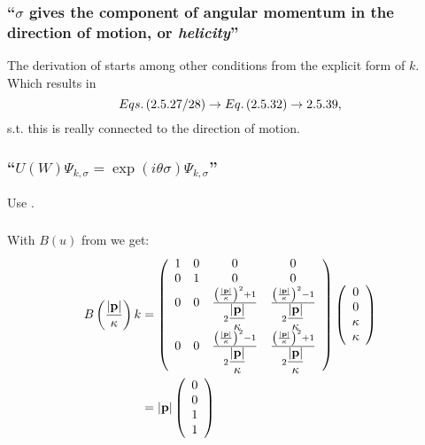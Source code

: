 \subsubsection{\enquote{$\sigma$ gives the component of angular momentum in the direction of motion, or \emph{helicity}} }
The derivation of  starts among other conditions from the explicit form of $k$. Which results in \[Eqs.\,({2.5.27/28})\rightarrow Eq.\,({2.5.32})\rightarrow{2.5.39},\]
s.t. this is really connected to the direction of motion.

\subsubsection{\enquote{$U(W)\Psi_{k,\sigma}=\exp(i\theta\sigma)\Psi_{k,\sigma}$} }
Use .

\subsubsection{ }
With $B(u)$ from  we get:
\begin{align*} 
	B\left(\dfrac{\abs{\mathbf{p}}}{\kappa}\right) k&=
	\left(\begin{array}{cccc}
		1&  0&  0&  0\\
		0&  1&  0&  0\\
		0&  0&  \frac{\left(\frac{\abs{\mathbf{p}}}{\kappa}\right)^2+1}{2\dfrac{\abs{\mathbf{p}}}{\kappa}}&  \frac{\left(\frac{\abs{\mathbf{p}}}{\kappa}\right)^2-1}{2\dfrac{\abs{\mathbf{p}}}{\kappa}}\\
		0&  0&  \frac{\left(\frac{\abs{\mathbf{p}}}{\kappa}\right)^2-1}{2\dfrac{\abs{\mathbf{p}}}{\kappa}}& \frac{\left(\frac{\abs{\mathbf{p}}}{\kappa}\right)^2+1}{2\dfrac{\abs{\mathbf{p}}}{\kappa}}
	\end{array}\right)
	\left(
	\begin{array}{c}
		0\\
		0\\
		\kappa\\
		\kappa
	\end{array}
	\right)\\
	&=\abs{\mathbf{p}}
	\left(
	\begin{array}{c}
		0\\
		0\\
		1\\
		1
	\end{array}
	\right)
\end{align*}

